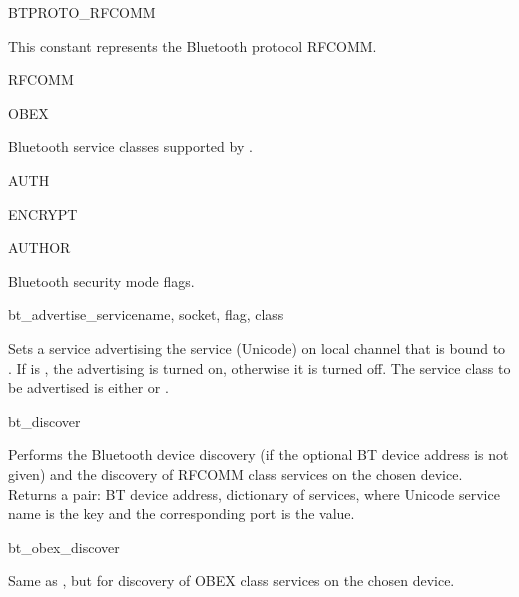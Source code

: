 \begin{datadesc}{BTPROTO_RFCOMM}

This constant represents the Bluetooth protocol RFCOMM.

\end{datadesc}

\begin{datadesc}{RFCOMM}
\end{datadesc}
\begin{datadesc}{OBEX}

Bluetooth service classes supported by .

\end{datadesc}

\begin{datadesc}{AUTH}
\end{datadesc}
\begin{datadesc}{ENCRYPT}
\end{datadesc}
\begin{datadesc}{AUTHOR}

Bluetooth security mode flags.

\end{datadesc}

\begin{funcdesc}{bt_advertise_service}{name, socket, flag, class}

Sets a service advertising the service  (Unicode) on local channel 
that is bound to . If  is , the advertising is 
turned on, otherwise it is turned off. The service class to be advertised is 
either  or .

\end{funcdesc}

\begin{funcdesc}{bt_discover}{}

Performs the Bluetooth device discovery (if the optional BT device address 
is not given) and the discovery of RFCOMM class services on the chosen 
device. Returns a pair: BT device address, dictionary of services, where 
Unicode service name is the key and the corresponding port is the value.

\end{funcdesc}

\begin{funcdesc}{bt_obex_discover}{}

Same as , but for discovery of OBEX class services on the 
chosen device.

\end{funcdesc}

